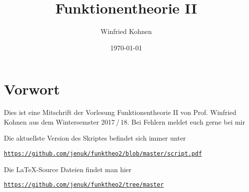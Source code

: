 \documentclass[]{scrbook}
\title{Funktionentheorie II}
\author{Winfried Kohnen}
\date{\today}
\begin{document}
\pagestyle{plain}

\maketitle

\chapter*{Vorwort}

Dies ist eine Mitschrift der Vorlesung Funktionentheorie II von Prof. Winfried Kohnen aus dem Wintersemster 2017\,/\,18.
Bei Fehlern meldet euch gerne bei mir

\begin{center}
\end{center}

Die aktuellste Version des Skriptes befindet sich immer unter
\begin{center}
\texttt{\url{https://github.com/jenuk/funktheo2/blob/master/script.pdf}}
\end{center}

Die \LaTeX-Source Dateien findet man hier
\begin{center}
\texttt{\url{https://github.com/jenuk/funktheo2/tree/master}}
\end{center}

\tableofcontents
\clearpage

\setcounter{page}{0}
\pagestyle{fancy}







\begin{appendices}


\printindex
\end{appendices}
\end{document}
